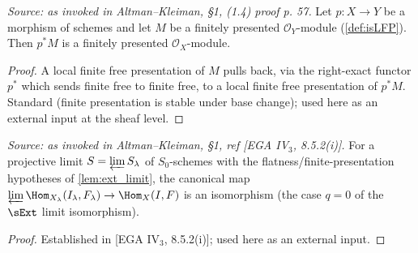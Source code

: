 \begin{theorem}
  \label{thm:pullback_preserves_fp}
  \textit{Source: as invoked in Altman--Kleiman, §1, (1.4) proof p. 57.}
  Let $p : X \to Y$ be a morphism of schemes and let $M$ be a finitely presented
  $\mathcal{O}_Y$-module (\cref{def:isLFP}). Then $p^* M$ is a finitely presented
  $\mathcal{O}_X$-module.
  \begin{proof}
    A local finite free presentation of $M$ pulls back, via the right-exact
    functor $p^*$ which sends finite free to finite free, to a local finite free
    presentation of $p^* M$. Standard (finite presentation is stable under base
    change); used here as an external input at the sheaf level.
  \end{proof}
\end{theorem}

\begin{theorem}[Flat base change / limit isomorphism for $\Hom$, $q=0$ (EGA)]
  \label{thm:ega_basechange_q0}
  \textit{Source: as invoked in Altman--Kleiman, §1, ref [EGA IV$_3$, 8.5.2(i)].}
  For a projective limit $S = \varprojlim S_\lambda$ of $S_0$-schemes with the
  flatness/finite-presentation hypotheses of \cref{lem:ext_limit}, the canonical
  map $\varprojlim \Hom_{X_\lambda}(I_\lambda, F_\lambda) \to \Hom_X(I,F)$ is an
  isomorphism (the case $q=0$ of the $\sExt$ limit isomorphism).
  \begin{proof}
    Established in [EGA IV$_3$, 8.5.2(i)]; used here as an external input.
  \end{proof}
\end{theorem}

